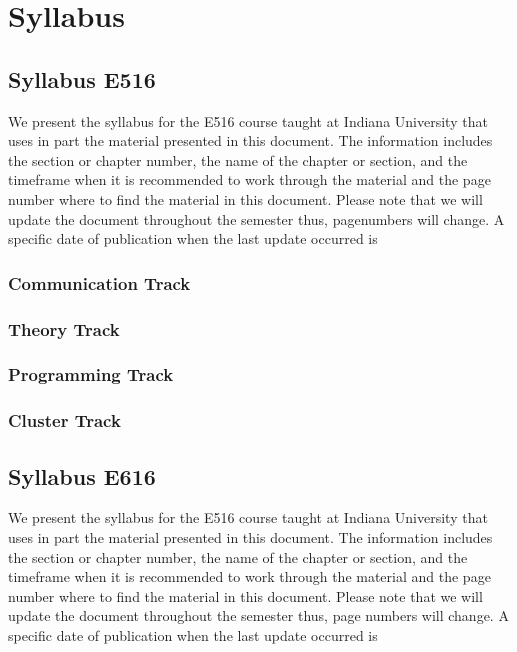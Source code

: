 \part{Syllabus}

\chapter{Syllabus E516}

We present the syllabus for the E516 course taught at Indiana
University that uses in part the material presented in this
document. The information includes the section or chapter number, the
name of the chapter or section, and the timeframe when it is
recommended to work through the material and the page number where to
find the material in this document. Please note that we will update
the document throughout the semester thus, pagenumbers will change. A
specific date of publication when the last update occurred is

\TODAY



\section{Communication Track}


\section{Theory Track}



\section{Programming Track}

\section{Cluster Track}

\chapter{Syllabus E616}

We present the syllabus for the E516 course taught at Indiana
University that uses in part the material presented in this
document. The information includes the section or chapter number, the
name of the chapter or section, and the timeframe when it is
recommended to work through the material and the page number where to
find the material in this document. Please note that we will update
the document throughout the semester thus, page numbers will change. A
specific date of publication when the last update occurred is


